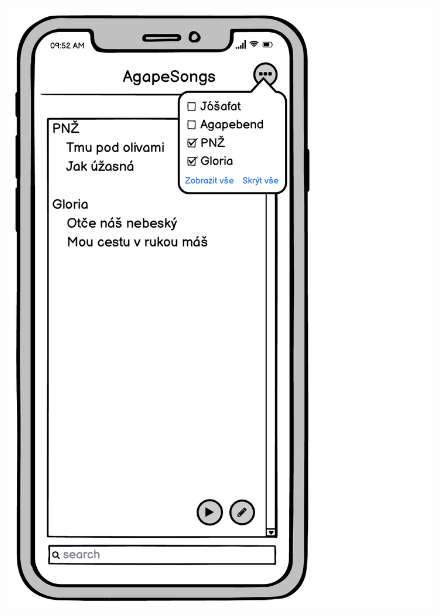 \begin{figure}
    \includegraphics[width=\textwidth/3 - 2pt]{images/3-navrh/3-7-dialog-filtr-zpevniku.pdf}

\end{figure}
